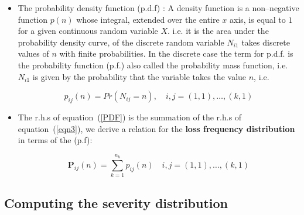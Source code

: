 \documentclass[]{article}
\begin{document}
\begin{itemize}
\item The probability density function (p.d.f) : A density function is a non--negative function $p(n)$ whose integral, extended over the entire $x$ axis, is equal to $1$ for a given continuous random variable $X$. i.e. it is the area under the probability density curve, of the discrete random variable $N_{i1}$ takes discrete values of $n$ with finite probabilities. In the discrete case the term for p.d.f. is the probability function (p.f.) also called the probability mass function, i.e. $N_{i1}$ is given by the probability that the variable takes the value $n$, i.e.

\singlespacing
\begin{equation}\label{eqn3}
p_{ij}(n)=Pr\left(N_{ij} = n\right), \quad{i,j}= (1,1),\ldots, (k,1) 
\end{equation} 
\doublespacing

\item The r.h.s of equation~(\ref{PDF}) is the summation of the r.h.s of equation~(\ref{eqn3}), we derive a relation for the \textbf{loss frequency distribution} in terms of the (p.f): 

\singlespacing
\begin{equation}\label{eqn4} 
\mathbf{P}_{ij}(n)=\sum_{k=1}^{n_k} p_{ij}(n) \quad{i,j}= (1,1),\ldots, (k,1)
\end{equation}
\doublespacing

\end{itemize}

\subsection{Computing the severity distribution}
\end{document}
